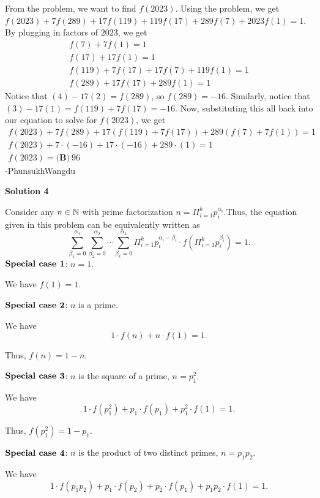\begin{enumerate}
From the problem, we want to find $f(2023)$. Using the problem, we get $f(2023)+7f(289)+17f(119)+119f(17)+289f(7)+2023f(1)=1$. By plugging in factors of $2023$, we get
 \begin{align} f(7)+7f(1)=1\\ f(17)+17f(1)=1\\ f(119)+7f(17)+17f(7)+119f(1)=1\\ f(289)+17f(17)+289f(1)=1 \end{align}Notice that $(4)-17(2)=f(289)$, so $f(289)=-16$. Similarly, notice that $(3)-17(1)=f(119)+7f(17)=-16$. Now, substituting this all back into our equation to solve for $f(2023)$, we get
 \begin{align*} f(2023)+7f(289)+17(f(119)+7f(17))+289(f(7)+7f(1))=1\\ f(2023)+7 \cdot (-16) + 17 \cdot (-16) + 289 \cdot (1) = 1\\ f(2023)=\boxed{\textbf{(B)} \ 96} \end{align*}
-PhunsukhWangdu

 



\textbf{Solution 4}

Consider any $n \in \Bbb N$ with prime factorization $n = \Pi_{i=1}^k p_i^{\alpha_i}$.Thus, the equation given in this problem can be equivalently written as
 \[ \sum_{\beta_1 = 0}^{\alpha_1} \sum_{\beta_2 = 0}^{\alpha_2} \cdots \sum_{\beta_k = 0}^{\alpha_k} \Pi_{i=1}^k p_i^{\alpha_i - \beta_i} \cdot f \left( \Pi_{i=1}^k p_i^{\beta_i} \right) = 1 . \]
$\noindent \textbf{Special case 1}$: $n = 1$.

 We have $f \left( 1 \right) = 1$.

 $\noindent \textbf{Special case 2}$: $n$ is a prime.

 We have
 \[ 1 \cdot f \left( n \right) + n \cdot f \left( 1 \right) = 1 . \]

 Thus, $f \left( n \right) = 1 - n$.

 $\noindent \textbf{Special case 3}$: $n$ is the square of a prime, $n = p_1^2$.

 We have
 \[ 1 \cdot f \left( p_1^2 \right) + p_1 \cdot f \left( p_1 \right) + p_1^2 \cdot f \left( 1 \right) = 1. \]

 Thus, $f \left( p_1^2 \right) = 1 - p_1$.

 $\noindent \textbf{Special case 4}$: $n$ is the product of two distinct primes, $n = p_1 p_2$.

 We have
 \[ 1 \cdot f \left( p_1 p_2 \right) + p_1 \cdot f \left( p_2 \right) + p_2 \cdot f \left( p_1 \right) + p_1 p_2 \cdot f \left( 1 \right) = 1. \]


\end{enumerate}
